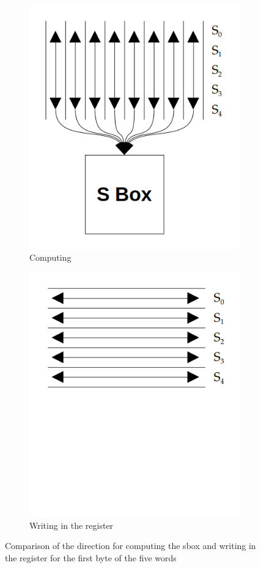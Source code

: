 \documentclass[11pt,technote]{IEEEtran}
\begin{document}
		\begin{figure}[h]
			\centering
			\begin{subfigure}{.18\textwidth}
				\centering
				\includegraphics[width=1\linewidth]{img_files/sbox_computation}
				\caption{Computing}
				\label{fig:comp}
			\end{subfigure}
			\begin{subfigure}{.22\textwidth}
				\centering
				\includegraphics[width=.8\linewidth]{img_files/sbox_writing}
				\caption{Writing in the register}
				\label{fig:writ}
			\end{subfigure}
			\caption{Comparison of the direction for computing the \ac{sbox} and writing in the register for the first byte of the five words}
			\label{fig:direction}
		\end{figure}
		
\end{document}
